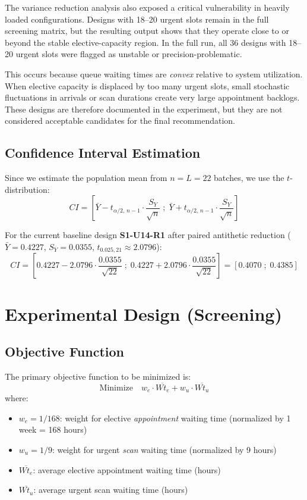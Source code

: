 \documentclass[12pt, a4paper]{article}
\begin{document}
The variance reduction analysis also exposed a critical vulnerability in heavily loaded configurations. Designs with 18--20 urgent slots remain in the full screening matrix, but the resulting output shows that they operate close to or beyond the stable elective-capacity region. In the full run, all 36 designs with 18--20 urgent slots were flagged as unstable or precision-problematic.

This occurs because queue waiting times are \textit{convex} relative to system utilization. When elective capacity is displaced by too many urgent slots, small stochastic fluctuations in arrivals or scan durations create very large appointment backlogs. These designs are therefore documented in the experiment, but they are not considered acceptable candidates for the final recommendation.

\subsection{Confidence Interval Estimation}

Since we estimate the population mean from $n = L = 22$ batches, we use the $t$-distribution:
\[
    CI = \left[\bar{Y} - t_{\alpha/2,\, n-1} \cdot \frac{S_Y}{\sqrt{n}} \;;\; \bar{Y} + t_{\alpha/2,\, n-1} \cdot \frac{S_Y}{\sqrt{n}}\right]
\]

For the current baseline design \textbf{S1-U14-R1} after paired antithetic reduction ($\bar{Y} = 0.4227$, $S_Y = 0.0355$, $t_{0.025,21} \approx 2.0796$):
\[
    CI = \left[0.4227 - 2.0796 \cdot \frac{0.0355}{\sqrt{22}} \;;\; 0.4227 + 2.0796 \cdot \frac{0.0355}{\sqrt{22}}\right] = [0.4070 \;;\; 0.4385]
\]

\section{Experimental Design (Screening)}

\subsection{Objective Function}

The primary objective function to be minimized is:
\[
    \text{Minimize} \quad w_e \cdot \overline{Wt_e} + w_u \cdot \overline{Wt_u}
\]
where:
\begin{itemize}
    \item $w_e = 1/168$: weight for elective \textit{appointment} waiting time (normalized by 1 week = 168 hours)
    \item $w_u = 1/9$: weight for urgent \textit{scan} waiting time (normalized by 9 hours)
    \item $\overline{Wt_e}$: average elective appointment waiting time (hours)
    \item $\overline{Wt_u}$: average urgent scan waiting time (hours)
\end{itemize}
\end{document}
